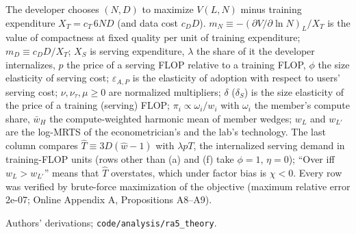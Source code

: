 \begin{table}[tp]
\par\smallskip
\begin{tablenotes}The developer chooses $(N,D)$ to maximize $V(L,N)$ minus training expenditure $X_T=c_T\,6ND$ (and data cost $c_DD$). $m_N\equiv-(\partial V/\partial\ln N)_L/X_T$ is the value of compactness at fixed quality per unit of training expenditure; $m_D\equiv c_DD/X_T$; $X_S$ is serving expenditure, $\lambda$ the share of it the developer internalizes, $p$ the price of a serving FLOP relative to a training FLOP, $\phi$ the size elasticity of serving cost; $\varepsilon_{A,P}$ is the elasticity of adoption with respect to users' serving cost; $\nu,\nu_\tau,\mu\ge0$ are normalized multipliers; $\delta$ ($\delta_S$) is the size elasticity of the price of a training (serving) FLOP; $\pi_i\propto\omega_i/w_i$ with $\omega_i$ the member's compute share, $\bar w_H$ the compute-weighted harmonic mean of member wedges; $w_L$ and $w_{L'}$ are the log-MRTS of the econometrician's and the lab's technology. The last column compares $\hat T\equiv3D(\hat w-1)$ with $\lambda pT$, the internalized serving demand in training-FLOP units (rows other than (a) and (f) take $\phi=1$, $\eta=0$); ``Over iff $w_L>w_{L'}$'' means that $\hat T$ overstates, which under factor bias is $\chi<0$. Every row was verified by brute-force maximization of the objective (maximum relative error 2e-07; Online Appendix A, Propositions A8--A9).\end{tablenotes}
\begin{tablenotes}[Source]Authors' derivations; \texttt{code/analysis/ra5\_theory}.\end{tablenotes}
\end{table}
